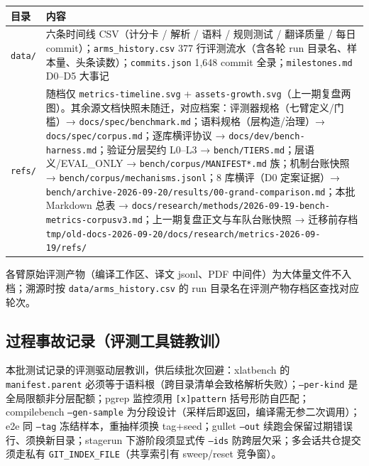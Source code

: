 \begin{center}\small
\begin{tabular}{@{}l>{\raggedright\arraybackslash}p{10.6cm}@{}}
\toprule
目录 & 内容 \\
\midrule
\texttt{data/} & 六条时间线 CSV（计分卡 / 解析 / 语料 / 规则测试 / 翻译质量 / 每日 commit）；\texttt{arms\_history.csv} 377 行评测流水（含各轮 run 目录名、样本量、头条读数）；\texttt{commits.json} 1{,}648 commit 全录；\texttt{milestones.md} D0--D5 大事记 \\
\midrule
\texttt{refs/} & 随档仅 \texttt{metrics-timeline.svg} + \texttt{assets-growth.svg}（上一期复盘两图）。其余源文档快照未随迁，对应档案：评测器规格（七臂定义/门槛）→ \texttt{docs/spec/benchmark.md}；语料规格（层构造/治理）→ \texttt{docs/spec/corpus.md}；逐库横评协议 → \texttt{docs/dev/bench-harness.md}；验证分层契约 L0--L3 → \texttt{bench/TIERS.md}；层语义/EVAL\_ONLY → \texttt{bench/corpus/MANIFEST*.md} 族；机制台账快照 → \texttt{bench/corpus/mechanisms.jsonl}；8 库横评（D0 定案证据）→ \texttt{bench/archive-2026-09-20/results/00-grand-comparison.md}；本批 Markdown 总表 → \texttt{docs/research/methods/2026-09-19-bench-metrics-corpusv3.md}；上一期复盘正文与车队台账快照 → 迁移前存档 \texttt{tmp/old-docs-2026-09-20/docs/research/metrics-2026-09-19/refs/} \\
\bottomrule
\end{tabular}
\end{center}

各臂原始评测产物（编译工作区、译文 jsonl、PDF 中间件）为大体量文件不入档；溯源时按 \texttt{data/arms\_history.csv} 的 run 目录名在评测产物存档区查找对应轮次。

\subsection{过程事故记录（评测工具链教训）}

本批测试记录的评测驱动层教训，供后续批次回避：xlatbench 的 \texttt{manifest.parent} 必须等于语料根（跨目录清单会致格解析失败）；\texttt{--per-kind} 是全局限额非分层配额；pgrep 监控须用 \texttt{[x]pattern} 括号形防自匹配；compilebench \texttt{--gen-sample} 为分段设计（采样后即返回，编译需无参二次调用）；e2e 同 \texttt{--tag} 冻结样本，重抽样须换 tag+seed；gullet \texttt{--out} 续跑会保留过期错误行、须换新目录；stagerun 下游阶段须显式传 \texttt{--ids} 防跨层欠采；多会话共仓提交须走私有 \texttt{GIT\_INDEX\_FILE}（共享索引有 sweep/reset 竞争窗）。
